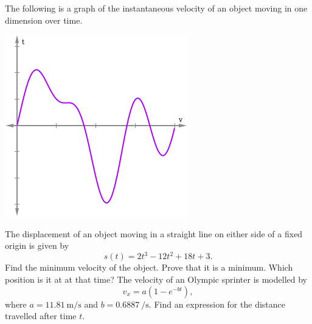 \begin{questions}
  \questioM The following is a graph of the instantaneous velocity of an object moving in one dimension over time.
            \begin{center}
              \includegraphics[width=0.4\linewidth]{velocity2}
            \end{center}
  \questioE The displacement of an object moving in a straight line on either side of a fixed origin is given by
            \begin{displaymath}
              s(t) = 2t^3 - 12t^2 + 18t + 3.
            \end{displaymath}
            Find the minimum velocity of the object. Prove that it is a minimum. Which position is it at at that time?
  \questioM The velocity of an Olympic sprinter is modelled by
            \begin{displaymath}
              v_x = a(1 - e^{-bt}),
            \end{displaymath}
            where $ a = \SI{11.81}{\metre\per\second} $ and $ b = \SI{0.6887}{\per\second} $. Find an expression for the
            distance travelled after time $ t $.
\end{questions}

